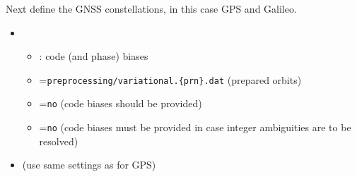 Next define the GNSS constellations, in this case GPS and Galileo.
\begin{itemize}
  \item {}
  \begin{itemize}
    \item {}: code (and phase) biases
    \item {}=\verb|preprocessing/variational.{prn}.dat| (prepared orbits)
    \item {}=\verb|no| (code biases should be provided)
    \item {}=\verb|no| (code biases must be provided in case integer ambiguities are to be resolved)
  \end{itemize}
  \item {} (use same settings as for GPS)
\end{itemize}

